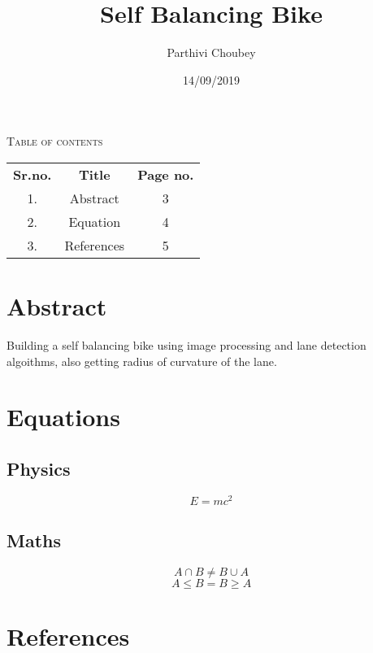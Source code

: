 \documentclass[a4paper,12pt]{article}
\begin{document}
	\title{Self Balancing Bike}
	\author{Parthivi Choubey}
	\date{14/09/2019}
	\maketitle
	\newpage
	\textsc{Table of contents}
	\begin{table}[h]
		\begin{tabular}{c c c}
			\textbf{Sr.no.} & \textbf{Title} & \textbf{Page no.}\\
			1. & Abstract & 3\\
			2. & Equation & 4\\
			3. & References & 5\\
		\end{tabular}
	\end{table}
	\newpage
	\section{Abstract}
	Building a self balancing bike using image processing and lane detection algoithms, also getting radius of curvature of the lane.
	\newpage
	\section{Equations}
	\subsection{Physics}
	\begin{equation}
	\label{emc}
	E = mc^2
	\end{equation}
	\subsection{Maths}
	\begin{equation}
	\label{set2}
	A \cap B \neq B \cup A
	\end{equation}
	\begin{equation}
	\label{set3}
	A \leq B = B \geq A
	\end{equation}
	\newpage
	
	\section{References}
	\cite{6740844}
	
	
\end{document}
